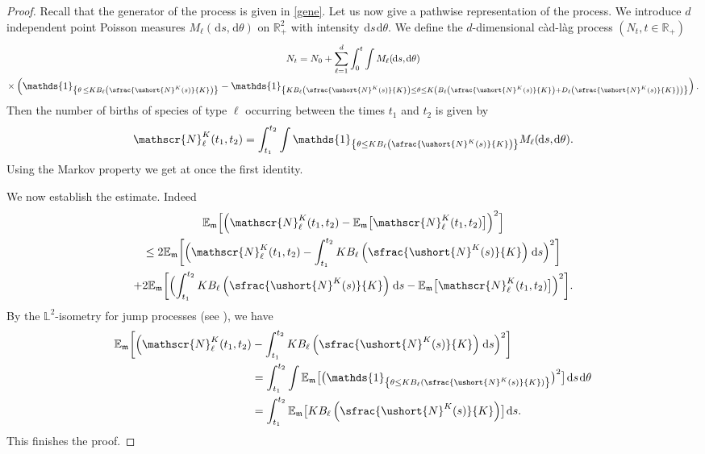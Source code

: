 \documentclass[10pt]{amsart}
\newcommand{\scaleto}[2]{#1}
\let\mathcal\mathscr
\numberwithin{equation}{section}
\theoremstyle{plain}
\theoremstyle{definition}
\newcommand{\E}{{\mathbb{E}}}
\newcommand{\sK}{K}
\newcommand{\un}{\mathds{1}}
\newcommand{\leproc}{\ushort{N}^{K}}
\newcommand{\sleproc}{\ushort{N}^{K}}
\newcommand{\dd}{\hspace{1pt}\mathrm{d}}
\begin{document}
\begin{proof}
Recall that the generator of the process is given in \eqref{gene}. Let us now give a pathwise representation of the process. We introduce $d$
independent point Poisson measures $M_{\ell}(\!\dd s, \!\dd\theta)$ on $\mathds{R}_{\scaleto{+}{4.5pt}}^{2}$ with intensity
$\dd s \dd\theta$. We define the $d$-dimensional càd-làg process $(N_{t}, t\in\mathds{R}_{\scaleto{+}{4.5pt}})$
\begin{multline*}
N_{t} = N_{0} + \sum_{\ell = 1}^d \int_{0}^t \int M_{\ell}(\!\dd s,\! \dd\theta) \\
\times \left(\un_{\left\{\theta\,\leq K B_{\ell}\left(\sfrac{\sleproc(s)}{K}\right)\right\}} -
\un_{\left\{K B_{\ell}\left(\sfrac{\sleproc(s)}{K}\right)\leq \theta\leq K \left(B_{\ell}\left(\sfrac{\sleproc(s)}{K}\right) +
D_{\ell}\left(\sfrac{\sleproc(s)}{\sK}\right)\right)\right\}} \right) .
\end{multline*}
Then the number of births of species of type $\ell$ occurring between the times $t_{1}$ and $t_{2}$ is given by
\[
\mathcal{N}^{\sK}_\ell(t_{1},t_{2}) = \int_{t_{1}}^{t_{2}} \int \un_{\left\{\theta\leq K B_{\ell}\left(\sfrac{\sleproc(s)}{K}\right)\right\}}
M_{\ell}(\!\dd s, \!\dd\theta).
\]
Using the Markov property we get at once the first identity.

We now establish the estimate. Indeed
\begin{multline*}
\E_{\mathfrak{m}}\Bigl[\Bigl(\mathcal{N}^{\sK}_\ell(t_{1},t_{2}) - \E_{\mathfrak{m}}\bigl[\mathcal{N}^{\sK}_\ell(t_{1},t_{2})\bigr]\Bigr)^2\Bigr]
\\
\leq 2\E_{\mathfrak{m}}\biggl[\Bigl(\mathcal{N}^{\sK}_\ell(t_{1},t_{2}) - \int_{t_{1}}^{t_{2}}
K B_{\ell}\left(\sfrac{\leproc(s)}{K}\right) \dd s\Bigr)^2\biggr]\\
+ 2\E_{\mathfrak{m}}\biggl[\Bigl(\int_{t_{1}}^{t_{2}} K B_{\ell}\left(\sfrac{\leproc(s)}{K}\right) \dd s -
\E_{\mathfrak{m}}\bigl[\mathcal{N}^{\sK}_\ell(t_{1},t_{2})\bigr] \Bigr)^2 \biggr].
\end{multline*}
By the $\mathds{L}^2$-isometry for jump processes (see \cite[(3.9) p.\,62]{Ikeda}), we have
\begin{align*}
\E_{\mathfrak{m}}\biggl[\Bigl(\mathcal{N}^{\sK}_\ell(t_{1},t_{2}) &- \int_{t_{1}}^{t_{2}} K B_{\ell}\left(\sfrac{\leproc(s)}{K}\right) \dd s\Bigr)^2\biggr]\\
&= \int_{t_{1}}^{t_{2}} \int \E_{\mathfrak{m}}\bigl[\bigl(\un_{\left\{\theta\leq K B_{\ell}(\sfrac{\sleproc(s)}{K})\right\}}\bigr)^2 \bigr]\dd s \dd \theta \\
&= \int_{t_{1}}^{t_{2}} \E_{\mathfrak{m}}\bigl[K B_{\ell}\left(\sfrac{\leproc(s)}{K}\right) \bigr]\dd s.
\end{align*}
This finishes the proof.
\end{proof}
\end{document}
